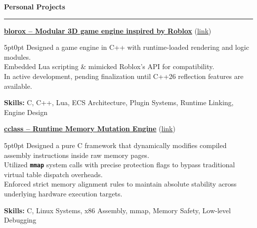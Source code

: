 \documentclass[9pt]{extarticle}
\begin{document}
\par\vspace{5pt}


{\large\bfseries Personal Projects}
\par\vspace{-8pt}
\rule{\linewidth}{0.4pt}
\par\vspace{5pt}

\underline{{\bfseries blorox -- Modular 3D game engine inspired by Roblox}} (\href{https://github.com/paulogarithm/blorox}{link})
\par
\begin{adjustwidth}{5pt}{0pt}
	Designed a game engine in C++ with runtime-loaded rendering and logic modules. \\
	Embedded Lua scripting \& mimicked Roblox's API for compatibility. \\
	In active development, pending finalization until C++26 reflection features are available.
\end{adjustwidth}
\par
{\bfseries Skills:} C, C++, Lua, ECS Architecture, Plugin Systems, Runtime Linking, Engine Design

\par\vspace{8pt}

\underline{\bfseries cclass -- Runtime Memory Mutation Engine} (\href{https://github.com/paulogarithm/cclass}{link})
\par
\begin{adjustwidth}{5pt}{0pt}
    Designed a pure C framework that dynamically modifies compiled assembly instructions inside raw memory pages. \\
    Utilized {\bfseries \texttt{mmap}} system calls with precise protection flags to bypass traditional virtual table dispatch overheads. \\
    Enforced strict memory alignment rules to maintain absolute stability across underlying hardware execution targets.
\end{adjustwidth}
\par
{\bfseries Skills:} C, Linux Systems, x86 Assembly, mmap, Memory Safety, Low-level Debugging

\par\vspace{8pt}
\end{document}
